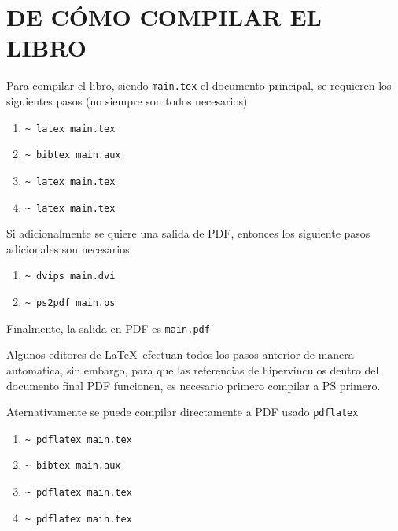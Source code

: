 \chapter{DE C\'OMO COMPILAR EL LIBRO}
Para compilar el libro, siendo \texttt{main.tex} el documento principal, se requieren los siguientes pasos (no siempre son todos necesarios)
\begin{enumerate}
\item \verb+~ latex main.tex+
\item \verb+~ bibtex main.aux+
\item \verb+~ latex main.tex+
\item \verb+~ latex main.tex+
\end{enumerate}
Si adicionalmente se quiere una salida de \ac{PDF}, entonces los siguiente pasos adicionales son
necesarios
\begin{enumerate}
\item \verb+~ dvips main.dvi+
\item \verb+~ ps2pdf main.ps+
\end{enumerate}
Finalmente, la salida en \ac{PDF} es {\tt main.pdf}

Algunos editores de \LaTeX\ efectuan todos los pasos anterior de manera automatica, sin embargo,
para que las referencias de hiperv\'inculos dentro del documento final \ac{PDF} funcionen,
es necesario primero compilar a \ac{PS} primero.

Aternativamente se puede compilar directamente a \ac{PDF} usado \verb+pdflatex+
\begin{enumerate}
\item \verb+~ pdflatex main.tex+
\item \verb+~ bibtex main.aux+
\item \verb+~ pdflatex main.tex+
\item \verb+~ pdflatex main.tex+
\end{enumerate}